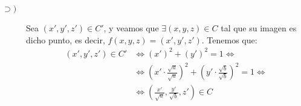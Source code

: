 \begin{ejercicio}
\begin{enumerate}
\begin{description}
            \item[$\supset)$] Sea $(x',y',z')\in C'$, y veamos que $\exists (x,y,z)\in C$ tal que su imagen es dicho punto, es decir, $f(x,y,z)=(x',y',z')$. Tenemos que:
            \begin{align*}
                (x',y',z')\in C' &\Longleftrightarrow
                (x')^2 + (y')^2 = 1 \Longleftrightarrow \\ & \Longleftrightarrow
                \left(x'\cdot \frac{\sqrt{a}}{\sqrt{a}}\right)^2 + \left(y'\cdot \frac{\sqrt{b}}{\sqrt{b}}\right)^2 = 1 \Longleftrightarrow \\ & \Longleftrightarrow
                \left(\frac{x'}{\sqrt{a}}, \frac{y'}{\sqrt{b}}, z'\right) \in C
            \end{align*}
        \end{description}

    \end{enumerate}
\end{ejercicio}



